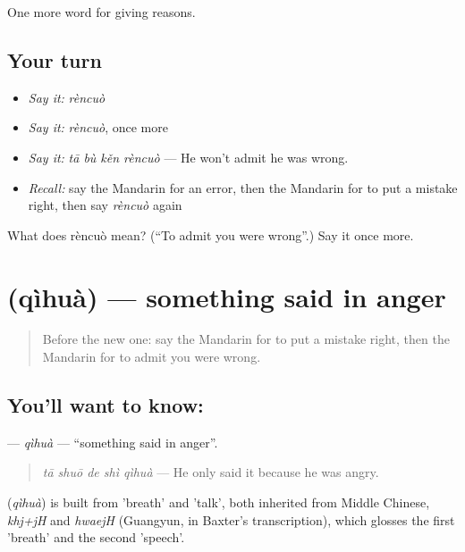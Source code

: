 \begin{grammarlens}[title={What you've built}]
One more word for giving reasons.
\end{grammarlens}

\subsection*{Your turn}
\begin{itemize}
\raggedright
  \item \emph{Say it:} \emph{rèncuò}
  \item \emph{Say it:} \emph{rèncuò}, once more
  \item \emph{Say it:} \emph{tā bù kěn rèncuò} — He won't admit he was wrong.
  \item \emph{Recall:} say the Mandarin for an error, then the Mandarin for to put a mistake right, then say \emph{rèncuò} again
\end{itemize}

\begin{tcolorbox}[breakable,colback=teal!4,colframe=teal!35!black,title={Before you move on}]
What does rèncuò mean? (\textquotedblleft{}To admit you were wrong\textquotedblright{}.) Say it once more.
\end{tcolorbox}
\section[\texorpdfstring{\zh{气话} (qìhuà)}{气话 (qìhuà)}]{ (qìhuà) — something said in anger}

\label{lesson:ZH-C357-qihua}



\begin{quote}
Before the new one: say the Mandarin for to put a mistake right, then the Mandarin for to admit you were wrong.
\end{quote}

\subsection*{You'll want to know: }
\textbf{} — \emph{qìhuà} — \textquotedblleft{}something said in anger\textquotedblright{}.

\begin{quote}
\textbf{} \emph{tā shuō de shì qìhuà} — He only said it because he was angry.
\end{quote}

\begin{cousinweb}
\textbf{} (\emph{qìhuà}) is built from  'breath' and  'talk', both inherited from Middle Chinese, \emph{khj+jH} and \emph{hwaejH} (Guangyun, in Baxter's transcription), which glosses the first 'breath' and the second 'speech'.
\end{cousinweb}

